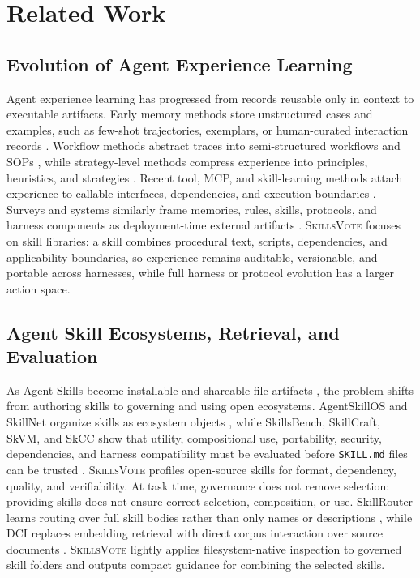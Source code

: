 \documentclass{llmxive}
\providecommand{\ours}{\textsc{SkillsVote}\xspace}
\begin{document}
\section{Related Work}
\subsection{Evolution of Agent Experience Learning}
Agent experience learning has progressed from records reusable only in context to executable artifacts. Early memory methods store unstructured cases and examples, such as few-shot trajectories, exemplars, or human-curated interaction records \citep{zhou2025memento,zheng2024synapse,wang2026memgovern}. Workflow methods abstract traces into semi-structured workflows and SOPs \citep{wang2025agent,fang2025memp}, while strategy-level methods compress experience into principles, heuristics, and strategies \citep{zhao2024expel,ouyang2026reasoningbank,cao2025remember,zhang2026agentic,cai2025training,cai2025flex,wang2026procedural}. Recent tool, MCP, and skill-learning methods attach experience to callable interfaces, dependencies, and execution boundaries \citep{lu2026beyond,liu2025unifying,huang2025cascade}. Surveys and systems similarly frame memories, rules, skills, protocols, and harness components as deployment-time external artifacts \citep{zhang2026experience,zhou2026externalization,lin2026position,zhang2026autogenesis,liang2026genericagent,lin2026agentic}. \ours focuses on skill libraries: a skill combines procedural text, scripts, dependencies, and applicability boundaries, so experience remains auditable, versionable, and portable across harnesses, while full harness or protocol evolution has a larger action space.

\subsection{Agent Skill Ecosystems, Retrieval, and Evaluation}
As Agent Skills become installable and shareable file artifacts \citep{agentSkills,anthropic2026claudeCodeSkills,openai2026ChatgptSkillsDocs,skillsmp2026,skillssh2026,openclaw2026SkillsDocs,hermes2026AgentSkillsGuide,openclaw2026clawhub}, the problem shifts from authoring skills to governing and using open ecosystems. AgentSkillOS and SkillNet organize skills as ecosystem objects \citep{li2026organizing,liang2026skillnet}, while SkillsBench, SkillCraft, SkVM, and SkCC show that utility, compositional use, portability, security, dependencies, and harness compatibility must be evaluated before \texttt{SKILL.md} files can be trusted \citep{li2026skillsbench,chen2026skillcraft,skvm2026,ouyang2026skcc}. \ours profiles open-source skills for format, dependency, quality, and verifiability. At task time, governance does not remove selection: providing skills does not ensure correct selection, composition, or use. SkillRouter learns routing over full skill bodies rather than only names or descriptions \citep{zheng2026skillrouter}, while DCI replaces embedding retrieval with direct corpus interaction over source documents \citep{li2026beyond}. \ours lightly applies filesystem-native inspection to governed skill folders and outputs compact guidance for combining the selected skills.
\end{document}

